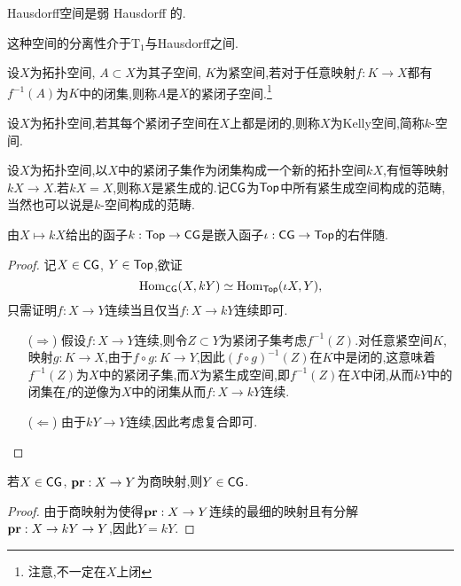 \begin{example}
    Hausdorff空间是弱 Hausdorff 的.
\end{example}
这种空间的分离性介于T$_1$与Hausdorff之间.
\begin{definition}[紧闭子空间]\label{定义:紧闭子空间}
    设$X$为拓扑空间, $A \subset X$为其子空间, $K$为紧空间,若对于任意映射$f : K \to X$都有$f^{-1}(A)$为$K$中的闭集,则称$A$是$X$的紧闭子空间.\footnote{注意,不一定在$X$上闭}
\end{definition}
\begin{definition}[Kelly空间]
    设$X$为拓扑空间,若其每个紧闭子空间在$X$上都是闭的,则称$X$为Kelly空间,简称$k$-空间.
\end{definition}
\begin{definition}[紧生成空间]\label{定义:紧生成空间}
    设$X$为拓扑空间,以$X$中的紧闭子集作为闭集构成一个新的拓扑空间$kX$,有恒等映射$kX \to X$.若$kX = X$,则称$X$是紧生成的.记$\mathsf{CG}$为$\mathsf{Top}$中所有紧生成空间构成的范畴,当然也可以说是$k$-空间构成的范畴.
\end{definition}
\begin{proposition}\label{命题:紧生成化与嵌入函子伴随}
    由$X \mapsto kX$给出的函子$k : \mathsf{Top} \to \mathsf{CG}$是嵌入函子$\iota: \mathsf{CG} \to \mathsf{Top}$的右伴随.
\end{proposition}
\begin{proof}
    记$X \in \mathsf{CG}$, $Y\in \mathsf{Top}$,欲证
    \[
    \operatorname{Hom}_{\mathsf{CG}}(X,kY)\simeq \operatorname{Hom}_{\mathsf{Top}}(\iota X,Y),
    \]
    只需证明$f : X \to Y$连续当且仅当$f : X \to kY$连续即可.
    \begin{enumerate}
        \item[($\Rightarrow$)]假设$f: X\to Y$连续,则令$Z \subset Y$为紧闭子集考虑$f^{-1}(Z)$.对任意紧空间$K$,映射$g: K \to X$,由于$f\circ g : K \to Y$,因此$(f\circ g)^{-1}(Z)$在$K$中是闭的,这意味着$f^{-1}(Z)$为$X$中的紧闭子集,而$X$为紧生成空间,即$f^{-1}(Z)$在$X$中闭,从而$kY$中的闭集在$f$的逆像为$X$中的闭集从而$f: X \to kY$连续.
        \item[($\Leftarrow$)]由于$kY \to Y$连续,因此考虑复合即可.
    \end{enumerate}
\end{proof}
\begin{proposition}\label{Pro:紧生成空间商映射}
    若$X \in \mathsf{CG}$, $\mathbf{pr}: X\to Y$为商映射,则$Y\in \mathsf{CG}$.
\end{proposition}
\begin{proof}
    由于商映射为使得$\mathbf{pr} : X \to Y$连续的最细的映射且有分解$\mathbf{pr} : X \to kY \to Y$,因此$Y = kY$.
\end{proof}
